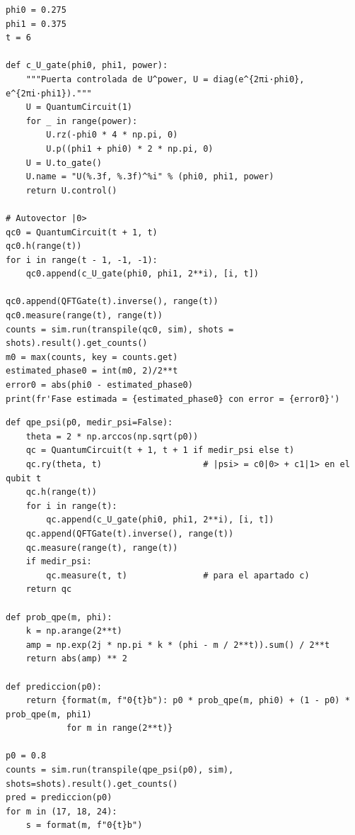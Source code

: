 \begin{lstlisting}[caption={Ejercicio E2.3: puerta controlada de $U^{k}$ para $U=\mathrm{diag}(e^{2\pi i\varphi_0},e^{2\pi i\varphi_1})$ y QPE sobre el autovector $|0\rangle$.},label={lst:b5_e23}]
phi0 = 0.275
phi1 = 0.375
t = 6

def c_U_gate(phi0, phi1, power):
    """Puerta controlada de U^power, U = diag(e^{2πi·phi0}, e^{2πi·phi1})."""
    U = QuantumCircuit(1)
    for _ in range(power):
        U.rz(-phi0 * 4 * np.pi, 0)
        U.p((phi1 + phi0) * 2 * np.pi, 0)
    U = U.to_gate()
    U.name = "U(%.3f, %.3f)^%i" % (phi0, phi1, power)
    return U.control()

# Autovector |0>
qc0 = QuantumCircuit(t + 1, t)
qc0.h(range(t))
for i in range(t - 1, -1, -1):
    qc0.append(c_U_gate(phi0, phi1, 2**i), [i, t])

qc0.append(QFTGate(t).inverse(), range(t))
qc0.measure(range(t), range(t))
counts = sim.run(transpile(qc0, sim), shots = shots).result().get_counts()
m0 = max(counts, key = counts.get)
estimated_phase0 = int(m0, 2)/2**t
error0 = abs(phi0 - estimated_phase0)
print(fr'Fase estimada = {estimated_phase0} con error = {error0}')
\end{lstlisting}

\begin{lstlisting}[caption={Ejercicio E2.4: QPE sobre una combinación lineal de autovectores y predicción teórica $P(m)$.},label={lst:b5_e24}]
def qpe_psi(p0, medir_psi=False):
    theta = 2 * np.arccos(np.sqrt(p0))
    qc = QuantumCircuit(t + 1, t + 1 if medir_psi else t)
    qc.ry(theta, t)                    # |psi> = c0|0> + c1|1> en el qubit t
    qc.h(range(t))
    for i in range(t):
        qc.append(c_U_gate(phi0, phi1, 2**i), [i, t])  
    qc.append(QFTGate(t).inverse(), range(t))
    qc.measure(range(t), range(t))
    if medir_psi:
        qc.measure(t, t)               # para el apartado c)
    return qc

def prob_qpe(m, phi):
    k = np.arange(2**t)
    amp = np.exp(2j * np.pi * k * (phi - m / 2**t)).sum() / 2**t
    return abs(amp) ** 2

def prediccion(p0):
    return {format(m, f"0{t}b"): p0 * prob_qpe(m, phi0) + (1 - p0) * prob_qpe(m, phi1)
            for m in range(2**t)}

p0 = 0.8
counts = sim.run(transpile(qpe_psi(p0), sim), shots=shots).result().get_counts()
pred = prediccion(p0)
for m in (17, 18, 24):
    s = format(m, f"0{t}b")
\end{lstlisting}
